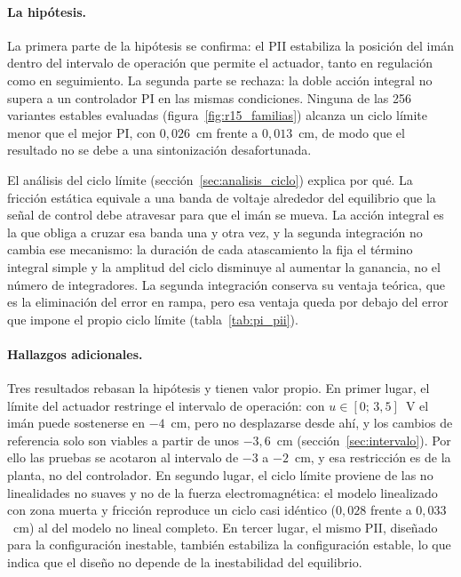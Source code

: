 \paragraph{La hipótesis.}
La primera parte de la hipótesis se confirma: el PII estabiliza la posición del imán dentro del intervalo de operación que permite el actuador, tanto en regulación como en seguimiento. La segunda parte se rechaza: la doble acción integral no supera a un controlador PI en las mismas condiciones. Ninguna de las 256 variantes estables evaluadas (figura~\ref{fig:r15_familias}) alcanza un ciclo límite menor que el mejor PI, con $0{,}026$~cm frente a $0{,}013$~cm, de modo que el resultado no se debe a una sintonización desafortunada.

El análisis del ciclo límite (sección~\ref{sec:analisis_ciclo}) explica por qué. La fricción estática equivale a una banda de voltaje alrededor del equilibrio que la señal de control debe atravesar para que el imán se mueva. La acción integral es la que obliga a cruzar esa banda una y otra vez, y la segunda integración no cambia ese mecanismo: la duración de cada atascamiento la fija el término integral simple y la amplitud del ciclo disminuye al aumentar la ganancia, no el número de integradores. La segunda integración conserva su ventaja teórica, que es la eliminación del error en rampa, pero esa ventaja queda por debajo del error que impone el propio ciclo límite (tabla~\ref{tab:pi_pii}).

\paragraph{Hallazgos adicionales.}
Tres resultados rebasan la hipótesis y tienen valor propio. En primer lugar, el límite del actuador restringe el intervalo de operación: con $u\in[0;\,3{,}5]$~V el imán puede sostenerse en $-4$~cm, pero no desplazarse desde ahí, y los cambios de referencia solo son viables a partir de unos $-3{,}6$~cm (sección~\ref{sec:intervalo}). Por ello las pruebas se acotaron al intervalo de $-3$ a $-2$~cm, y esa restricción es de la planta, no del controlador. En segundo lugar, el ciclo límite proviene de las no linealidades no suaves y no de la fuerza electromagnética: el modelo linealizado con zona muerta y fricción reproduce un ciclo casi idéntico ($0{,}028$ frente a $0{,}033$~cm) al del modelo no lineal completo. En tercer lugar, el mismo PII, diseñado para la configuración inestable, también estabiliza la configuración estable, lo que indica que el diseño no depende de la inestabilidad del equilibrio.

